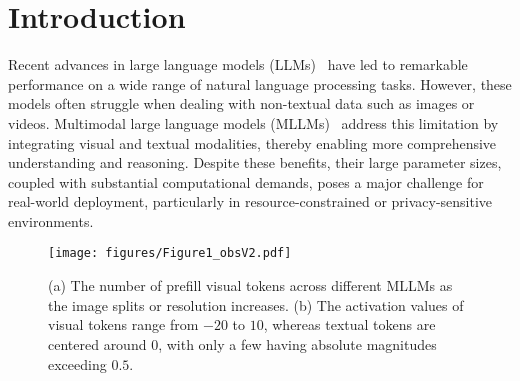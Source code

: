 \section{Introduction}
\label{intro}
\vspace{-2mm}
Recent advances in large language models (LLMs)~\citep{brown2020language,touvron2023llama,llama2,llama3} have led
to remarkable performance on a wide range of natural language processing tasks. However, these models often struggle
when dealing with non-textual data such as images or videos. Multimodal large language models (MLLMs)~\citep{reid2024gemini,achiam2023gpt4,wang2023cogvlm}
address this limitation by integrating visual and textual modalities, thereby enabling more comprehensive understanding
and reasoning. Despite these benefits, their large parameter sizes, coupled with substantial computational demands, poses
a major challenge for real-world deployment, particularly in resource-constrained or privacy-sensitive environments.


\begin{figure*}[t]
    \centering    
    \texttt{[image: figures/Figure1\_obsV2.pdf]}
    \vspace{-2.6mm}
    \caption{(a) The number of prefill visual tokens across different MLLMs as the image splits or resolution increases. (b) The activation values of visual tokens range from $-20$ to $10$, whereas textual tokens are centered around $0$, with only a few having absolute magnitudes exceeding $0.5$.} 
    \label{fig:obs12}
\vspace{-5mm}
\end{figure*}

